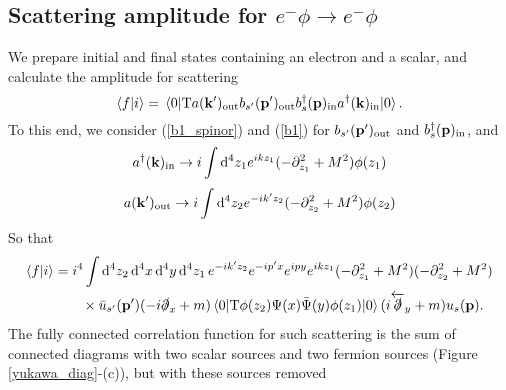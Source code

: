 \subsection{Scattering amplitude for $e^-\phi\to e^-\phi$}
We prepare initial and final states containing an electron and a scalar, and calculate the amplitude for scattering
\begin{equation}
    \braket{f}{i}=\vev{\text{T}a(\vb{k}^\prime)_{\text{out}}b_{s^\prime}(\vb{p}^\prime)_{\text{out}}b^\dagger_{s}(\vb{p})_{\text{in}}a^\dagger(\vb{k})_{\text{in}}}.
\end{equation}
To this end, we consider (\ref{b1_spinor}) and (\ref{b1}) for $b_{s^\prime}(\vb{p}^\prime)_{\text{out}}$ and $b^\dagger_{s}(\vb{p})_{\text{in}}$, and 
\begin{equation}
    a^\dagger(\vb{k})_{\text{in}}\to i\int\dd^4 z_1 e^{ikz_1}(-\partial^2_{z_1}+M^2)\phi(z_1)
    \label{ain}
\end{equation}
\begin{equation}
    a(\vb{k}^\prime)_{\text{out}}\to i\int\dd^4 z_2 e^{-ik^\prime z_2}(-\partial^2_{z_2}+M^2)\phi(z_2)
    \label{aout}
\end{equation}
So that
\begin{equation}
\begin{aligned}
\braket{f}{i}&=i^4\int\dd^4z_2\,\dd^4x\,\dd^4y\,\dd^4z_1\,e^{-ik^\prime z_2}e^{-ip^\prime x}e^{ipy}e^{ikz_1}(-\partial^2_{z_1}+M^2)(-\partial^2_{z_2}+M^2)\\&\qquad\times \bar{u}_{s^\prime}(\vb{p}^\prime)(-i\slashed{\partial}_x+m)\vev{\text{T}\phi(z_2)\Psi(x)\bar{\Psi}(y)\phi(z_1)}(i\overleftarrow{\slashed{\partial}}_y+m)u_s(\vb{p}).
\end{aligned}
\end{equation}
The fully connected correlation function for such scattering is the sum of connected diagrams with two scalar sources and two fermion sources (Figure \ref{yukawa_diag}-(c)), but with these sources removed
